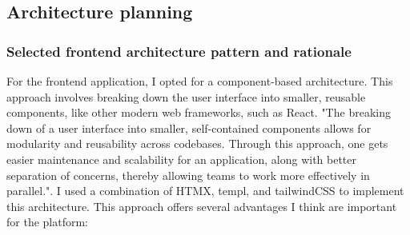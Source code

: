 \begin{table}[H]
    \centering
    \caption{HTMX vs. traditional SPA frameworks}
    \label{tab:htmx-vs-others}
\end{table}

\subsection{Architecture planning}

\subsubsection{Selected frontend architecture pattern and rationale}

For the frontend application, I opted for a component-based architecture. This approach involves breaking down the user interface into smaller, reusable components, like other modern web frameworks, such as React. "The breaking down of a user interface into smaller, self-contained components allows for modularity and reusability across codebases. Through this approach, one gets easier maintenance and scalability for an application, along with better separation of concerns, thereby allowing teams to work more effectively in parallel."\cite{Kothapalli2021ComponentBased}. I used a combination of HTMX, templ, and tailwindCSS to implement this architecture. This approach offers several advantages I think are important for the platform:

